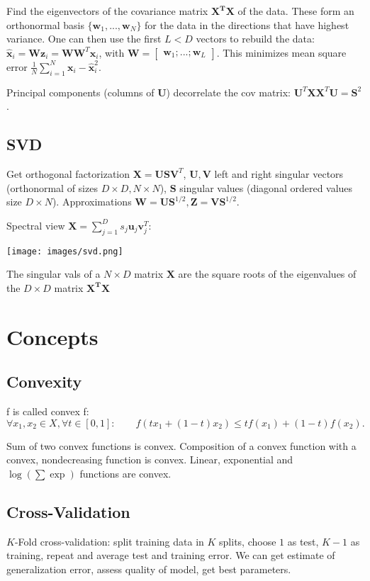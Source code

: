 \documentclass[10pt,a4paper,landscape]{article}
\renewcommand{\bf}[1]{\ensuremath{\mathbf{#1}}}
\begin{document}
\begin{multicols*}{4}
Find the eigenvectors of the covariance matrix $\bf{X^T X}$ of the data. These form an orthonormal basis $\{ \bf{w}_1, ..., \bf{w}_N\}$ for the data in the directions that have highest variance.
One can then use the first $L < D$ vectors to rebuild the data: $\bf{\hat{x}}_i = \bf{W} \bf{z}_i = \bf{W} \bf{W}^T \bf{x}_i$, with $\bf{W} = \begin{bmatrix} \bf{w}_1 ; ... ; \bf{w}_L \end{bmatrix}$.
This minimizes mean square error $\frac{1}{N} \sum_{i=1}^N \bf{x}_i - \bf{\hat{x}}_i^2$.

Principal components (columns of $\bf{U}$) decorrelate the cov matrix: $\bf{U}^T \bf{XX}^T \bf{U} = \bf{S}^2$.

\subsection{SVD}
Get orthogonal factorization $\bf{X} = \bf{USV}^T$, $\bf{U}, \bf{V}$ left and right singular vectors (orthonormal of sizes $D \times D, N \times N$), $\bf{S}$ singular values (diagonal ordered values size $D \times N$). Approximations $\bf{W} = \bf{US}^{1/2}, \bf{Z} = \bf{VS}^{1/2}$.

Spectral view $\bf{X} = \sum_{j=1}^D s_j \bf{u}_j \bf{v}_j^T$:
\begin{colfig}
  \centering
  \texttt{[image: images/svd.png]}
\end{colfig}

The singular vals of a $N \times D$ matrix $\bf{X}$ are the square roots of the eigenvalues of the $D \times D$ matrix $\bf{X^T X}$


\section{Concepts}

\subsection{Convexity}
f is called convex f: $\forall x_1, x_2 \in X, \forall t \in [0, 1]: \qquad f(tx_1+(1-t)x_2)\leq t f(x_1)+(1-t)f(x_2).$

Sum of two convex functions is convex. Composition of a convex function with a convex, nondecreasing function is convex. Linear, exponential and $\log(\sum \exp)$ functions are convex.

\subsection{Cross-Validation}
$K$-Fold cross-validation: split training data in $K$ splits, choose $1$ as test, $K-1$ as training, repeat and average test and training error. We can get estimate of generalization error, assess quality of model, get best parameters.


\end{multicols*}
\end{document}

